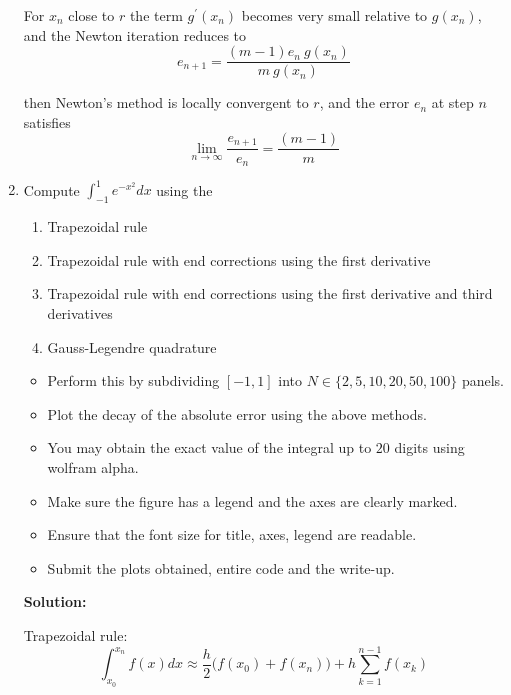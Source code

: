 \documentclass[a4paper,11pt]{report}
\begin{document}
\begin{enumerate}
    For $x_{n}$ close to $r$ the term $g^{\prime}(x_{n})$ becomes very small relative to $g(x_{n})$, and the Newton iteration reduces to
    \begin{equation*}
    e_{n+1} = \frac{(m-1)e_{n}\ g(x_{n})}{m\ g(x_{n})}
    \end{equation*}

    then Newton's method is locally convergent to $r$, and the error $e_{n}$ at step $n$ satisfies
    \begin{equation*}
    \lim_{n \rightarrow \infty} \frac{e_{n+1}}{e_{n}} = \frac{(m-1)}{m}
    \end{equation*}


    \item Compute $\displaystyle \int_{-1}^{1} e^{-x^{2}} dx$ using the

    \begin{enumerate}
    \item Trapezoidal rule
    \item Trapezoidal rule with end corrections using the first derivative
    \item Trapezoidal rule with end corrections using the first derivative and third
    derivatives
    \item Gauss-Legendre quadrature
    \end{enumerate}

    \begin{itemize}
    \item Perform this by subdividing $[-1, 1]$ into $N \in \{2, 5, 10, 20, 50, 100\}$ 
    panels.
    \item Plot the decay of the absolute error using the above methods.
    \item You may obtain the exact value of the integral up to $20$ digits using
    wolfram alpha.
    \item Make sure the figure has a legend and the axes are clearly marked.
    \item Ensure that the font size for title, axes, legend are readable.
    \item Submit the plots obtained, entire code and the write-up.
    \end{itemize}

    \textbf{Solution:}

    Trapezoidal rule:
    \begin{equation*}
    \int_{x_{0}}^{x_{n}} f(x) dx \approx \frac{h}{2} \Big(f(x_{0}) + f(x_{n}) \Big) + h \sum_{k=1}^{n-1} f(x_{k})
    \end{equation*}


\end{enumerate}
\end{document}
